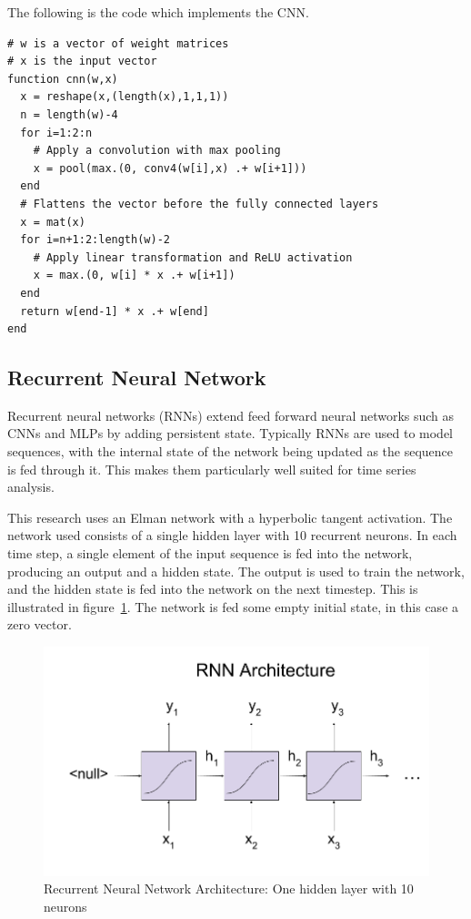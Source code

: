 The following is the code which implements the CNN.

\begin{lstlisting}
# w is a vector of weight matrices
# x is the input vector
function cnn(w,x)
  x = reshape(x,(length(x),1,1,1))
  n = length(w)-4
  for i=1:2:n
    # Apply a convolution with max pooling
    x = pool(max.(0, conv4(w[i],x) .+ w[i+1]))
  end
  # Flattens the vector before the fully connected layers
  x = mat(x)
  for i=n+1:2:length(w)-2
    # Apply linear transformation and ReLU activation
    x = max.(0, w[i] * x .+ w[i+1])
  end
  return w[end-1] * x .+ w[end]
end
\end{lstlisting}

\subsection{Recurrent Neural Network}

Recurrent neural networks (RNNs) extend feed forward neural networks such as CNNs and MLPs by adding persistent state.
Typically RNNs are used to model sequences, with the internal state of the network being updated as the sequence is fed through it.
This makes them particularly well suited for time series analysis.

This research uses an Elman network with a hyperbolic tangent activation\cite{elman1990finding}.
The network used consists of a single hidden layer with 10 recurrent neurons.
In each time step, a single element of the input sequence is fed into the network, producing an output and a hidden state.
The output is used to train the network, and the hidden state is fed into the network on the next timestep.
This is illustrated in figure~\ref{rnn_architecture}.
The network is fed some empty initial state, in this case a zero vector.

\begin{figure}
\includegraphics[width=\linewidth]{images/rnn_architecture.png}
\caption{Recurrent Neural Network Architecture: One hidden layer with 10 neurons}
\label{rnn_architecture}
\end{figure}
\clearpage
\newpage

